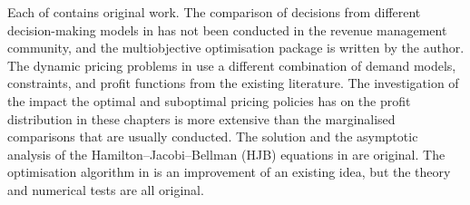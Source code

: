 \documentclass[main.tex]{subfiles}
\begin{document}
Each of
contains original work.  The comparison of decisions from different
decision-making models in  has not been conducted in
the revenue management community, and the multiobjective optimisation
package is written by the author.  The dynamic pricing problems in
 use a different combination
of demand models, constraints, and profit functions from the existing
literature.  The investigation of the impact the optimal and
suboptimal pricing policies has on the profit distribution in these
chapters is more extensive than the marginalised comparisons that are
usually conducted. The solution and the asymptotic analysis of the
Hamilton--Jacobi--Bellman (HJB)
equations in  are original.  The optimisation
algorithm in  is an improvement of an existing idea,
but the theory and numerical tests are all original.
\end{document}
